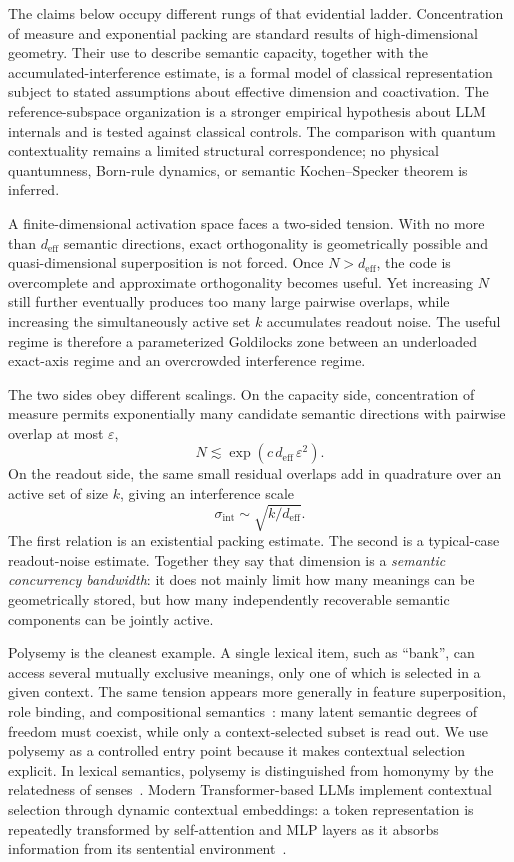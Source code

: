 \documentclass[
  aps,
  reprint,
  superscriptaddress,
  floatfix,
  nofootinbib,
  longbibliography
]{revtex4-2}
\newcommand{\deff}{d_{\mathrm{eff}}}
\newcommand{\sint}{\sigma_{\mathrm{int}}}
\begin{document}
The claims below occupy different rungs of that evidential
ladder.  Concentration of measure and exponential packing are standard
results of high-dimensional geometry.  Their use to describe semantic
capacity, together with the accumulated-interference estimate, is a formal
model of classical representation subject to stated assumptions about
effective dimension and coactivation.  The reference-subspace organization is
a stronger empirical hypothesis about LLM internals and is tested against
classical controls.  The comparison with quantum contextuality remains a
limited structural correspondence; no physical quantumness, Born-rule
dynamics, or semantic Kochen--Specker theorem is inferred.

A finite-dimensional activation space faces a two-sided tension.  With no
more than $\deff$ semantic directions, exact orthogonality is geometrically
possible and quasi-dimensional superposition is not forced.  Once
$N>\deff$, the code is overcomplete and approximate orthogonality becomes
useful.  Yet increasing $N$ still further eventually produces too many large
pairwise overlaps, while increasing the simultaneously active set $k$
accumulates readout noise.  The useful regime is therefore a parameterized
Goldilocks zone between an underloaded exact-axis regime and an overcrowded
interference regime.

The two sides obey different scalings. On the capacity side,
concentration of measure permits exponentially many candidate semantic
directions with pairwise overlap at most $\varepsilon$,
%
\begin{equation}
\label{eq:intro-capacity}
N\lesssim \exp(c\,\deff\,\varepsilon^{2}).
\end{equation}
%
On the readout side, the same small residual overlaps add in quadrature
over an active set of size $k$, giving an interference scale
%
\begin{equation}
\label{eq:intro-readout}
\sint\sim\sqrt{k/\deff}.
\end{equation}
%
The first relation is an existential packing estimate. The second is a
typical-case readout-noise estimate. Together they say that dimension
is a \emph{semantic concurrency bandwidth}: it does not mainly limit how
many meanings can be geometrically stored, but how many independently
recoverable semantic components can be jointly active.

Polysemy is the cleanest example. A single lexical item, such as
``bank'', can access several mutually exclusive meanings, only one of
which is selected in a given context. The same tension appears more
generally in feature superposition, role binding, and compositional
semantics~\cite{mikolov2013}: many latent semantic degrees of freedom
must coexist, while only a context-selected subset is read out. We use
polysemy as a controlled entry point because it makes contextual
selection explicit. In lexical semantics, polysemy is distinguished
from homonymy by the relatedness of senses~\cite{pustejovsky1995}.
Modern Transformer-based LLMs implement contextual selection through
dynamic contextual embeddings: a token representation is repeatedly
transformed by self-attention and MLP layers as it absorbs information
from its sentential environment~\cite{Vaswani-2017-Attention}.
\end{document}
